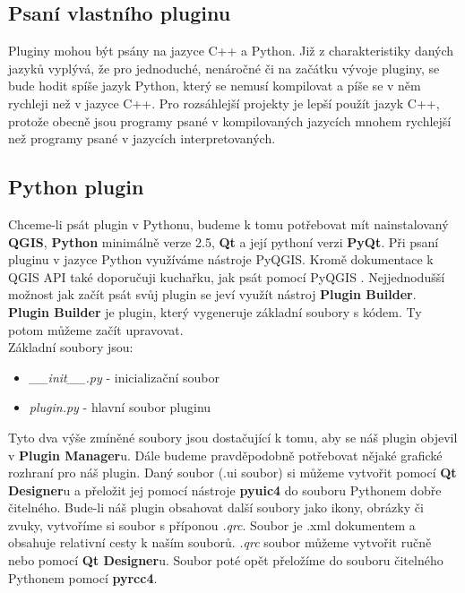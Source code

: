 \subsection{Psaní vlastního pluginu}
Pluginy mohou být psány na jazyce C++ a Python. Již z charakteristiky daných jazyků vyplývá, že pro jednoduché, nenáročné či na začátku vývoje pluginy, se bude hodit spíše jazyk Python, který se nemusí kompilovat a píše se v něm rychleji než v jazyce C++. Pro rozsáhlejší projekty je lepší použít jazyk C++, protože obecně jsou programy psané v kompilovaných jazycích mnohem rychlejší než programy psané v jazycích interpretovaných. 

\subsection{Python plugin}
\nocite{pyqgis:www}
Chceme-li psát plugin v Pythonu, budeme k tomu potřebovat mít nainstalovaný \textbf{QGIS}, \textbf{Python} minimálně verze 2.5, \textbf{Qt} a její pythoní verzi \textbf{PyQt}. Při psaní pluginu v jazyce Python využíváme nástroje PyQGIS. Kromě dokumentace k QGIS API \cite{qgis_api:www} také doporučuji kuchařku, jak psát pomocí PyQGIS \cite{pyqgis:www}. Nejjednodušší možnost jak začít psát svůj plugin se jeví využít nástroj \textbf{Plugin Builder}. \textbf{Plugin Builder} je plugin, který vygeneruje základní soubory s kódem. Ty potom můžeme začít upravovat. \\

\noindent Základní soubory jsou:
\begin{itemize}
	\item \textit{\_\_init\_\_.py} - inicializační soubor
	\item \textit{plugin.py} - hlavní soubor pluginu
\end{itemize}

Tyto dva výše zmíněné soubory jsou dostačující k tomu, aby se náš plugin objevil v \textbf{Plugin Manager}u. Dále budeme pravděpodobně potřebovat nějaké grafické rozhraní pro náš plugin. Daný soubor (.ui soubor) si můžeme vytvořit pomocí \textbf{Qt Designer}u a přeložit jej pomocí nástroje  \textbf{pyuic4} do souboru Pythonem dobře čitelného. Bude-li náš plugin obsahovat další soubory jako ikony, obrázky či zvuky, vytvoříme si soubor s příponou \textit{.qrc}. Soubor je .xml dokumentem a obsahuje relativní cesty k naším souborů. \textit{.qrc} soubor můžeme vytvořit ručně nebo pomocí \textbf{Qt Designer}u. Soubor poté opět přeložíme do souboru čitelného Pythonem pomocí  \textbf{pyrcc4}.

